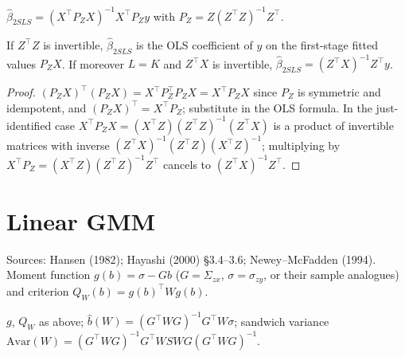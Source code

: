 \begin{definition}[2SLS]
\label{def:tsls}
\leanok
{}
$\hat\beta_{2SLS} = (X^\top P_ZX)^{-1}X^\top P_Zy$ with $P_Z = Z(Z^\top Z)^{-1}Z^\top$.
\end{definition}

\begin{theorem}
\label{thm:tsls}
\leanok
{}
If $Z^\top Z$ is invertible, $\hat\beta_{2SLS}$ is the OLS coefficient of $y$ on the first-stage fitted values $P_ZX$. If
moreover $L = K$ and $Z^\top X$ is invertible, $\hat\beta_{2SLS} = (Z^\top X)^{-1}Z^\top y$.
\end{theorem}
\begin{proof}
\leanok
$(P_ZX)^\top(P_ZX) = X^\top P_Z^\top P_ZX = X^\top P_ZX$ since $P_Z$ is symmetric and idempotent, and
$(P_ZX)^\top = X^\top P_Z$; substitute in the OLS formula. In the just-identified case
$X^\top P_ZX = (X^\top Z)(Z^\top Z)^{-1}(Z^\top X)$ is a product of invertible matrices with inverse
$(Z^\top X)^{-1}(Z^\top Z)(X^\top Z)^{-1}$; multiplying by $X^\top P_Z = (X^\top Z)(Z^\top Z)^{-1}Z^\top$ cancels to
$(Z^\top X)^{-1}Z^\top$.
\end{proof}

\section{Linear GMM}
\label{sec:gmm}

Sources: Hansen (1982); Hayashi (2000) \S3.4--3.6; Newey--McFadden (1994). Moment function $g(b) = \sigma - Gb$
($G = \Sigma_{zx}$, $\sigma = \sigma_{zy}$, or their sample analogues) and criterion $Q_W(b) = g(b)^\top Wg(b)$.

\begin{definition}
\label{def:gmm}
\leanok
$g$, $Q_W$ as above; $\hat b(W) = (G^\top WG)^{-1}G^\top W\sigma$; sandwich variance
$\mathrm{Avar}(W) = (G^\top WG)^{-1}G^\top WSWG(G^\top WG)^{-1}$.
\end{definition}

